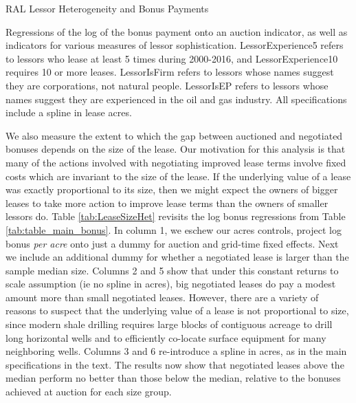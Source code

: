 \begin{appendices}
\addtolength{\tabcolsep}{5pt}
\begin{table}[H]
\begin{center}
\begin{threeparttable}
	\caption{RAL Lessor Heterogeneity and Bonus Payments}
	\label{tab:LessorHet}
 	\small
   	            
    \footnotesize
    \begin{tablenotes}
    	\item Regressions of the log of the bonus payment onto an auction indicator, as well as indicators for various measures of lessor sophistication.  LessorExperience5 refers to lessors who lease at least 5 times during 2000-2016, and LessorExperience10 requires 10 or more leases.  LessorIsFirm refers to lessors whose names suggest they are corporations, not natural people.  LessorIsEP refers to lessors whose names suggest they are experienced in the oil and gas industry.  All specifications include a spline in lease acres. 
    \end{tablenotes}
\end{threeparttable}
\end{center}
\end{table}

We also measure the extent to which the gap between auctioned and negotiated bonuses depends on the size of the lease. Our motivation for this analysis is that many of the actions involved with negotiating improved lease terms involve fixed costs which are invariant to the size of the lease. If the underlying value of a lease was exactly proportional to its size, then we might expect the owners of bigger leases to take more action to improve lease terms than the owners of smaller lessors do. Table \ref{tab:LeaseSizeHet} revisits the log bonus regressions from Table \ref{tab:table_main_bonus}. In column 1, we eschew our acres controls, project log bonus \textit{per acre} onto just a dummy for auction and grid-time fixed effects. Next we include an additional dummy for whether a negotiated lease is larger than the sample median size. Columns 2 and 5 show that under this constant returns to scale assumption (ie no spline in acres), big negotiated leases do pay a modest amount more than small negotiated leases. However, there are a variety of reasons to suspect that the underlying value of a lease is not proportional to size, since modern shale drilling requires large blocks of contiguous acreage to drill long horizontal wells and to efficiently co-locate surface equipment for many neighboring wells. Columns 3 and 6 re-introduce a spline in acres, as in the main specifications in the text. The results now show that negotiated leases above the median perform no better than those below the median, relative to the bonuses achieved at auction for each size group. 


\end{appendices}
